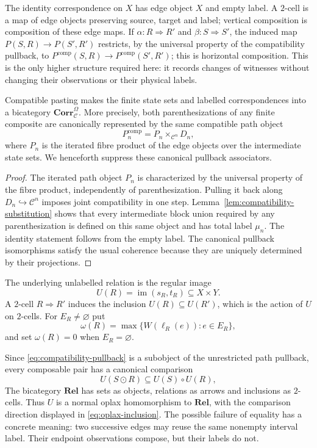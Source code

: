 The identity correspondence on $X$ has edge object $X$ and empty label.  A $2$-cell is a map of edge objects preserving source, target and label; vertical composition is composition of these edge maps.  If $\alpha:R\Rightarrow R'$ and $\beta:S\Rightarrow S'$, the induced map $P(S,R)\to P(S',R')$ restricts, by the universal property of the compatibility pullback, to $P^{\mathrm{comp}}(S,R)\to P^{\mathrm{comp}}(S',R')$; this is horizontal composition.  This is the only higher structure required here: it records changes of witnesses without changing their observations or their physical labels.

\begin{lemma}\label{lem:labelled-relation-category}
Compatible pasting makes the finite state sets and labelled correspondences into a bicategory $\mathbf{Corr}_{\mathcal C}^{\Omega}$.  More precisely, both parenthesizations of any finite composite are canonically represented by the same compatible path object
\[
P_n^{\mathrm{comp}}
=
P_n\times_{\mathcal C^n}D_n,
\]
where $P_n$ is the iterated fibre product of the edge objects over the intermediate state sets.  We henceforth suppress these canonical pullback associators.
\end{lemma}

\begin{proof}
The iterated path object $P_n$ is characterized by the universal property of the fibre product, independently of parenthesization.  Pulling it back along $D_n\hookrightarrow\mathcal C^n$ imposes joint compatibility in one step.  Lemma~\ref{lem:compatibility-substitution} shows that every intermediate block union required by any parenthesization is defined on this same object and has total label $\mu_n$.  The identity statement follows from the empty label.  The canonical pullback isomorphisms satisfy the usual coherence because they are uniquely determined by their projections.
\end{proof}

The underlying unlabelled relation is the regular image
\begin{equation}\label{eq:underlying-relation}
U(R)=\operatorname{im}(s_R,t_R)\subseteq X\times Y.
\end{equation}
A $2$-cell $R\Rightarrow R'$ induces the inclusion $U(R)\subseteq U(R')$, which is the action of $U$ on $2$-cells.
For $E_R\ne\varnothing$ put
\[
\omega(R)=\max\{W(\ell_R(e)):e\in E_R\},
\]
and set $\omega(R)=0$ when $E_R=\varnothing$.

Since \eqref{eq:compatibility-pullback} is a subobject of the unrestricted path pullback, every composable pair has a canonical comparison
\begin{equation}\label{eq:oplax-inclusion}
U(S\odot R)\subseteq U(S)\circ U(R),
\end{equation}
The bicategory $\mathbf{Rel}$ has sets as objects, relations as arrows and inclusions as $2$-cells.  Thus $U$ is a normal oplax homomorphism to $\mathbf{Rel}$, with the comparison direction displayed in \eqref{eq:oplax-inclusion}.  The possible failure of equality has a concrete meaning: two successive edges may reuse the same nonempty interval label.  Their endpoint observations compose, but their labels do not.

